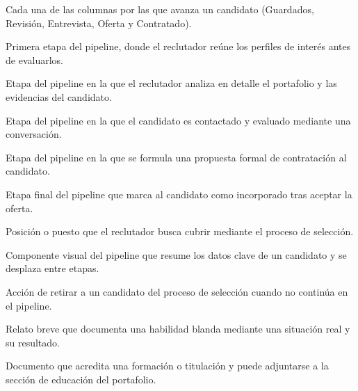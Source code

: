 \begin{description}[style=unboxed,leftmargin=0pt,itemsep=4pt]
    \item[\textcolor{colorPrimario}{\textbf{Etapa del pipeline}}] Cada una de las
    columnas por las que avanza un candidato (Guardados, Revisión, Entrevista, Oferta y
    Contratado).

    \item[\textcolor{colorPrimario}{\textbf{Guardados}}] Primera etapa del pipeline,
    donde el reclutador reúne los perfiles de interés antes de evaluarlos.

    \item[\textcolor{colorPrimario}{\textbf{Revisión}}] Etapa del pipeline en la que el
    reclutador analiza en detalle el portafolio y las evidencias del candidato.

    \item[\textcolor{colorPrimario}{\textbf{Entrevista}}] Etapa del pipeline en la que el
    candidato es contactado y evaluado mediante una conversación.

    \item[\textcolor{colorPrimario}{\textbf{Oferta}}] Etapa del pipeline en la que se
    formula una propuesta formal de contratación al candidato.

    \item[\textcolor{colorPrimario}{\textbf{Contratado}}] Etapa final del pipeline que
    marca al candidato como incorporado tras aceptar la oferta.

    \item[\textcolor{colorPrimario}{\textbf{Vacante}}] Posición o puesto que el
    reclutador busca cubrir mediante el proceso de selección.

    \item[\textcolor{colorPrimario}{\textbf{Tarjeta de candidato}}] Componente visual del
    pipeline que resume los datos clave de un candidato y se desplaza entre etapas.

    \item[\textcolor{colorPrimario}{\textbf{Descarte}}] Acción de retirar a un candidato
    del proceso de selección cuando no continúa en el pipeline.

    \item[\textcolor{colorPrimario}{\textbf{Caso de éxito}}] Relato breve que documenta
    una habilidad blanda mediante una situación real y su resultado.

    \item[\textcolor{colorPrimario}{\textbf{Certificado}}] Documento que acredita una
    formación o titulación y puede adjuntarse a la sección de educación del portafolio.


\end{description}
